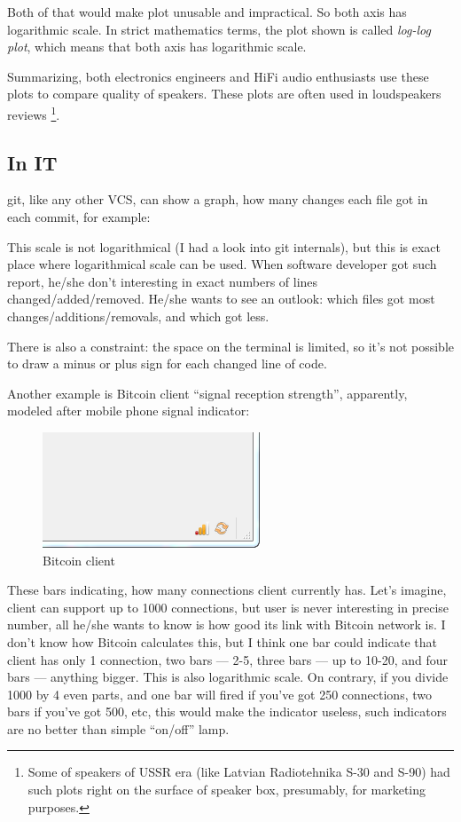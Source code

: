 Both of that would make plot unusable and impractical.
So both axis has logarithmic scale.
In strict mathematics terms, the plot shown is called \textit{log-log plot}, which means that both axis has logarithmic scale.

Summarizing, both electronics engineers and HiFi audio enthusiasts use these plots to compare quality of speakers.
These plots are often used in loudspeakers reviews
\footnote{Some of speakers of USSR era (like Latvian Radiotehnika S-30 and S-90) 
had such plots right on the surface of speaker box, presumably, for marketing purposes.}.

\subsection{In IT}

git, like any other VCS, can show a graph, how many changes each file got in each commit, for example:



This scale is not logarithmical (I had a look into git internals), but this is exact place where logarithmical scale can be used.
When software developer got such report, he/she don't interesting in exact numbers of lines changed/added/removed.
He/she wants to see an outlook: which files got most changes/additions/removals, and which got less.

There is also a constraint: the space on the terminal is limited, so it's not possible to draw a minus or plus sign for each changed line of code.

Another example is Bitcoin client ``signal reception strength'', apparently, modeled after mobile phone signal indicator:

\begin{figure}[H]
\centering
\includegraphics[scale=1]{log/bitcoin_bars.png}
\caption{Bitcoin client}
\end{figure}

These bars indicating, how many connections client currently has.
Let's imagine, client can support up to 1000 connections, but user is never interesting in precise number, all he/she wants to know is how good its link
with Bitcoin network is.
I don't know how Bitcoin calculates this, but I think one bar could indicate that client has only 1 connection, two bars --- 2-5, three bars --- up to 10-20,
and four bars --- anything bigger.
This is also logarithmic scale.
On contrary, if you divide 1000 by 4 even parts, and one bar will fired if you've got 250 connections, two bars if you've got 500, etc, 
this would make the indicator useless, such indicators are no better than simple ``on/off'' lamp.

